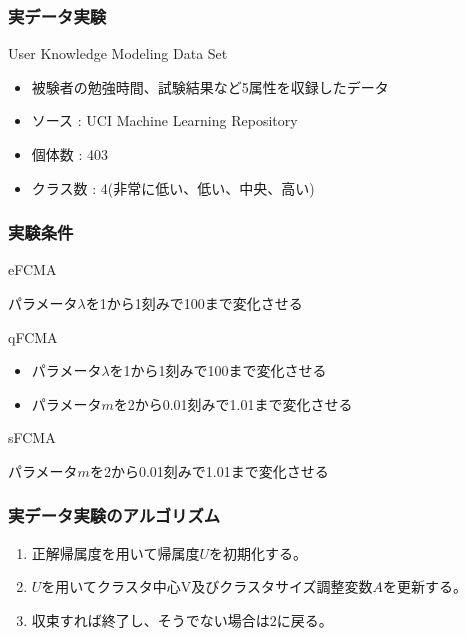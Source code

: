 \documentclass[13pt,dvipdfmx]{beamer}
\begin{document}
\begin{frame}\frametitle{実データ実験}
  \begin{block}{User Knowledge Modeling Data Set}
    \begin{itemize}
    \item 被験者の勉強時間、試験結果など5属性を収録したデータ
    \item ソース : UCI  Machine Learning Repository
    \item 個体数 : 403
    \item クラス数 : 4(非常に低い、低い、中央、高い)
    \end{itemize}
  \end{block}
\end{frame}

\begin{frame}\frametitle{実験条件}
  \begin{block}{eFCMA}
    \begin{center}
      パラメータ$\lambda$を1から1刻みで100まで変化させる
    \end{center}
  \end{block}
  \begin{block}{qFCMA}
    \begin{itemize}
      \item パラメータ$\lambda$を1から1刻みで100まで変化させる
      \item パラメータ$m$を2から0.01刻みで1.01まで変化させる
    \end{itemize}
  \end{block}
  \begin{block}{sFCMA}
    \begin{center}
      パラメータ$m$を2から0.01刻みで1.01まで変化させる
    \end{center}
  \end{block}
\end{frame}

\begin{frame}\frametitle{実データ実験のアルゴリズム}
  \begin{enumerate}
  \item 正解帰属度を用いて帰属度$U$を初期化する。
  \item $U$を用いてクラスタ中心V及びクラスタサイズ調整変数$A$を更新する。
  \item 収束すれば終了し、そうでない場合は$2$に戻る。
  \end{enumerate}
\end{frame}
\end{document}
